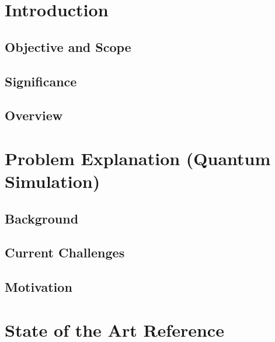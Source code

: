 \documentclass[12pt,oneside,a4paper]{article}
\begin{document}
\section{Introduction} 

\subsection{Objective and Scope}

\subsection{Significance}

\subsection{Overview}


\section{Problem Explanation (Quantum Simulation)} 

\subsection{Background}

\subsection{Current Challenges}

\subsection{Motivation}


\section{State of the Art Reference} 
\end{document}
